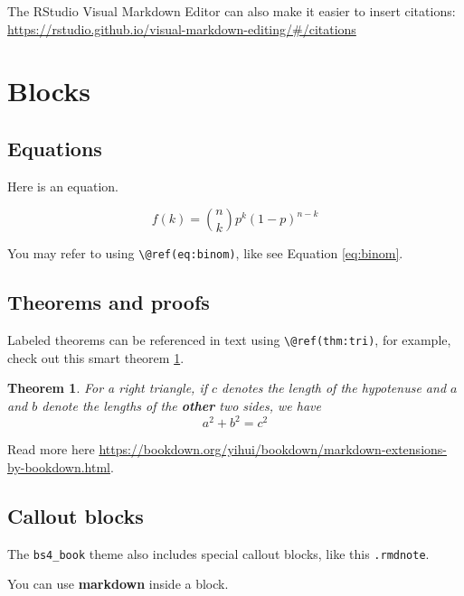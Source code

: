 \documentclass[
]{book}
\newtheorem{theorem}{Theorem}[chapter]
\theoremstyle{definition}
\theoremstyle{definition}
\theoremstyle{definition}
\theoremstyle{definition}
\theoremstyle{remark}
\begin{document}
The RStudio Visual Markdown Editor can also make it easier to insert citations: \url{https://rstudio.github.io/visual-markdown-editing/\#/citations}

\hypertarget{blocks}{%
\section{Blocks}\label{blocks}}

\hypertarget{equations}{%
\subsection{Equations}\label{equations}}

Here is an equation.

\begin{equation} 
  f\left(k\right) = \binom{n}{k} p^k\left(1-p\right)^{n-k}
  \label{eq:binom}
\end{equation}

You may refer to using \texttt{\textbackslash{}@ref(eq:binom)}, like see Equation \eqref{eq:binom}.

\hypertarget{theorems-and-proofs}{%
\subsection{Theorems and proofs}\label{theorems-and-proofs}}

Labeled theorems can be referenced in text using \texttt{\textbackslash{}@ref(thm:tri)}, for example, check out this smart theorem \ref{thm:tri}.

\begin{theorem}
\protect\hypertarget{thm:tri}{}\label{thm:tri}For a right triangle, if \(c\) denotes the \emph{length} of the hypotenuse
and \(a\) and \(b\) denote the lengths of the \textbf{other} two sides, we have
\[a^2 + b^2 = c^2\]
\end{theorem}

Read more here \url{https://bookdown.org/yihui/bookdown/markdown-extensions-by-bookdown.html}.

\hypertarget{callout-blocks}{%
\subsection{Callout blocks}\label{callout-blocks}}

The \texttt{bs4\_book} theme also includes special callout blocks, like this \texttt{.rmdnote}.

You can use \textbf{markdown} inside a block.
\end{document}
